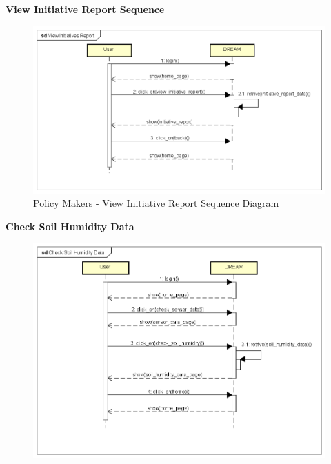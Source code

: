 \documentclass[table, 12pt]{article}
\begin{document}
\begin{itemize}
            \textbf{View Initiative Report Sequence}\\
            \begin{center}
                \begin{figure}[H]
                    \includegraphics[scale=0.60, center]{assets/Sequence diagrams/Policy Maker/View Initiatives Report.png}
                    \caption{Policy Makers - View Initiative Report Sequence Diagram}
                    \label{fig: sequence_initreport}
                \end{figure}
            \end{center}
            \newpage
            \textbf{Check Soil Humidity Data}\\
            \begin{center}
                \begin{figure}[H]
                    \includegraphics[scale=0.60, center]{assets/Sequence diagrams/Policy Maker/Check Soil Humidity Data.png}

\end{figure}
\end{center}
\end{itemize}
\end{document}
